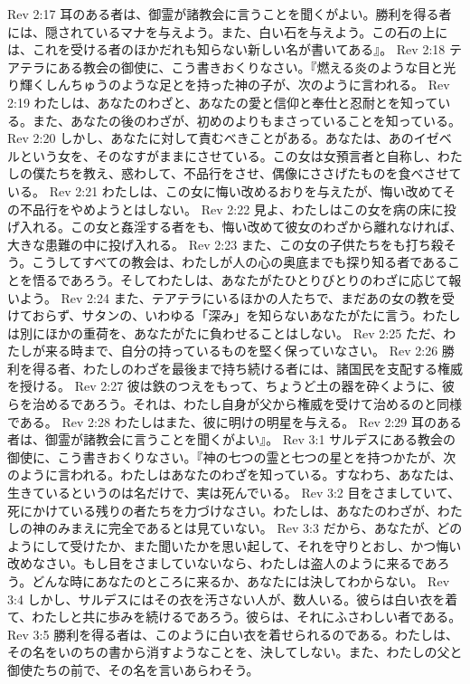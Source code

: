 Rev 2:17  耳のある者は、御霊が諸教会に言うことを聞くがよい。勝利を得る者には、隠されているマナを与えよう。また、白い石を与えよう。この石の上には、これを受ける者のほかだれも知らない新しい名が書いてある』。
Rev 2:18  テアテラにある教会の御使に、こう書きおくりなさい。『燃える炎のような目と光り輝くしんちゅうのような足とを持った神の子が、次のように言われる。
Rev 2:19  わたしは、あなたのわざと、あなたの愛と信仰と奉仕と忍耐とを知っている。また、あなたの後のわざが、初めのよりもまさっていることを知っている。
Rev 2:20  しかし、あなたに対して責むべきことがある。あなたは、あのイゼベルという女を、そのなすがままにさせている。この女は女預言者と自称し、わたしの僕たちを教え、惑わして、不品行をさせ、偶像にささげたものを食べさせている。
Rev 2:21  わたしは、この女に悔い改めるおりを与えたが、悔い改めてその不品行をやめようとはしない。
Rev 2:22  見よ、わたしはこの女を病の床に投げ入れる。この女と姦淫する者をも、悔い改めて彼女のわざから離れなければ、大きな患難の中に投げ入れる。
Rev 2:23  また、この女の子供たちをも打ち殺そう。こうしてすべての教会は、わたしが人の心の奥底までも探り知る者であることを悟るであろう。そしてわたしは、あなたがたひとりびとりのわざに応じて報いよう。
Rev 2:24  また、テアテラにいるほかの人たちで、まだあの女の教を受けておらず、サタンの、いわゆる「深み」を知らないあなたがたに言う。わたしは別にほかの重荷を、あなたがたに負わせることはしない。
Rev 2:25  ただ、わたしが来る時まで、自分の持っているものを堅く保っていなさい。
Rev 2:26  勝利を得る者、わたしのわざを最後まで持ち続ける者には、諸国民を支配する権威を授ける。
Rev 2:27  彼は鉄のつえをもって、ちょうど土の器を砕くように、彼らを治めるであろう。それは、わたし自身が父から権威を受けて治めるのと同様である。
Rev 2:28  わたしはまた、彼に明けの明星を与える。
Rev 2:29  耳のある者は、御霊が諸教会に言うことを聞くがよい』。
Rev 3:1  サルデスにある教会の御使に、こう書きおくりなさい。『神の七つの霊と七つの星とを持つかたが、次のように言われる。わたしはあなたのわざを知っている。すなわち、あなたは、生きているというのは名だけで、実は死んでいる。
Rev 3:2  目をさましていて、死にかけている残りの者たちを力づけなさい。わたしは、あなたのわざが、わたしの神のみまえに完全であるとは見ていない。
Rev 3:3  だから、あなたが、どのようにして受けたか、また聞いたかを思い起して、それを守りとおし、かつ悔い改めなさい。もし目をさましていないなら、わたしは盗人のように来るであろう。どんな時にあなたのところに来るか、あなたには決してわからない。
Rev 3:4  しかし、サルデスにはその衣を汚さない人が、数人いる。彼らは白い衣を着て、わたしと共に歩みを続けるであろう。彼らは、それにふさわしい者である。
Rev 3:5  勝利を得る者は、このように白い衣を着せられるのである。わたしは、その名をいのちの書から消すようなことを、決してしない。また、わたしの父と御使たちの前で、その名を言いあらわそう。
